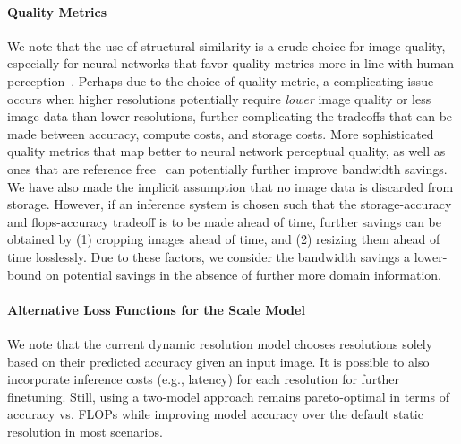 \paragraph{Quality Metrics}
We note that the use of structural similarity is a crude choice for image quality, especially for neural networks that favor quality metrics more in line with human perception~\cite{zhang2018unreasonable}.
Perhaps due to the choice of quality metric, a complicating issue occurs when higher resolutions potentially require \emph{lower} image quality or less image data than lower resolutions, further complicating the tradeoffs that can be made between accuracy, compute costs, and storage costs.
More sophisticated quality metrics that map better to neural network perceptual quality, as well as ones that are reference free~\cite{wang2011reduced} can potentially further improve bandwidth savings.
We have also made the implicit assumption that no image data is discarded from storage.
However, if an inference system is chosen such that the storage-accuracy and flops-accuracy tradeoff is to be made ahead of time, further savings can be obtained by (1) cropping images ahead of time, and (2) resizing them ahead of time losslessly.
Due to these factors, we consider the bandwidth savings a lower-bound on potential savings in the absence of further more domain information.

\paragraph{Alternative Loss Functions for the Scale Model}
We note that the current dynamic resolution model chooses resolutions solely based on their predicted accuracy given an input image.
It is possible to also incorporate inference costs (e.g., latency) for each resolution for further finetuning.
Still, using a two-model approach remains pareto-optimal in terms of accuracy vs. FLOPs while improving model accuracy over the default static resolution in most scenarios.






